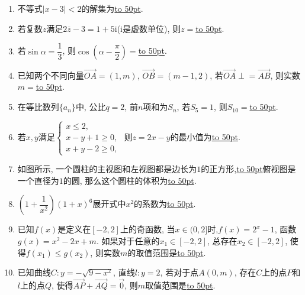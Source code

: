\documentclass[10pt,a4paper]{article}
\newcommand{\blank}[1]{\underline{\hbox to #1pt{}}}
\begin{document}
\begin{enumerate}[1.]
\item 不等式$|x-3|<2$的解集为\blank{50}.
\item 若复数$z$满足$2 \overline z-3=1+5 \mathrm{i}$($\mathrm{i}$是虚数单位), 则$z=$\blank{50}.  
\item 若$\sin\alpha =\dfrac13$, 则$\cos(\alpha -\dfrac{\pi}2)=$\blank{50}.  
\item 已知两个不同向量$\overrightarrow{OA}=(1,m)$, $\overrightarrow{OB}=(m-1,2)$, 若$\overrightarrow{OA}\perp =\overrightarrow{AB}$, 则实数$m=$\blank{50}.  
\item 在等比数列$\{a_n\}$中, 公比$q=2$, 前$n$项和为$S_n$, 若$S_5=1$, 则$S_{10}=$\blank{50}.  
\item 若$x,y$满足$\begin{cases}x\le 2, \\ x-y+1\ge 0, \\ x+y-2\ge 0,\end{cases}$ 则$z=2x-y$的最小值为\blank{50}.  
\item 如图所示, 一个圆柱的主视图和左视图都是边长为$1$的正方形,\blank{50}俯视图是一个直径为$1$的圆, 那么这个圆柱的体积为\blank{50}.
\begin{center}
\end{center}
\item $(1+\dfrac1{x^2})(1+x)^6$展开式中$x^2$的系数为\blank{50}.  
\item 已知$f(x)$是定义在$[-2,2]$上的奇函数, 当$x\in (0,2]$时,$f(x)=2^x-1$, 函数$g(x)=x^2-2x+m$. 如果对于任意的$x_1\in [-2,2]$, 总存在$x_2\in [-2,2]$, 使得$f(x_1)\le g(x_2)$, 则实数$m$的取值范围是\blank{50}. 
\item 已知曲线$C:y=-\sqrt{9-x^2}$, 直线$l:y=2$, 若对于点$A(0,m)$, 存在$C$上的点$P$和$l$上的点$Q$, 使得$\overrightarrow{AP}+\overrightarrow{AQ}=\overrightarrow 0$, 则$m$取值范围是\blank{50}. 



\end{enumerate}
\end{document}

